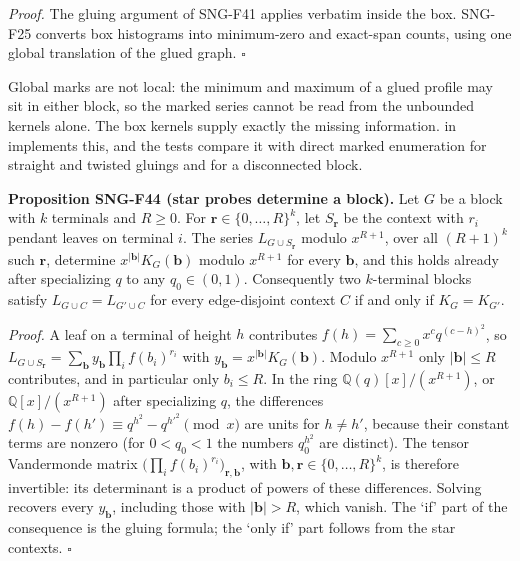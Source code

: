 \documentclass[
  11pt,
  a4paper,
]{report}
\let\singularitytexttt\texttt
\renewcommand{\texttt}[1]{\singularitytexttt{\seqsplit{#1}}}
\begin{document}
\emph{Proof.} The gluing argument of SNG-F41 applies verbatim inside the
box. SNG-F25 converts box histograms into minimum-zero and exact-span
counts, using one global translation of the glued graph. \(\square\)

Global marks are not local: the minimum and maximum of a glued profile
may sit in either block, so the marked series cannot be read from the
unbounded kernels alone. The box kernels supply exactly the missing
information. \texttt{marked\_glue} in
\texttt{src/singularity/terminals.py} implements this, and the tests
compare it with direct marked enumeration for straight and twisted
gluings and for a disconnected block.

\textbf{Proposition SNG-F44 (star probes determine a block).} Let \(G\)
be a block with \(k\) terminals and \(R\ge0\). For
\(\mathbf r\in\{0,\ldots,R\}^k\), let \(S_{\mathbf r}\) be the context
with \(r_i\) pendant leaves on terminal \(i\). The series
\(L_{G\cup S_{\mathbf r}}\) modulo \(x^{R+1}\), over all \((R+1)^k\)
such \(\mathbf r\), determine \(x^{|\mathbf b|}K_G(\mathbf b)\) modulo
\(x^{R+1}\) for every \(\mathbf b\), and this holds already after
specializing \(q\) to any \(q_0\in(0,1)\). Consequently two
\(k\)-terminal blocks satisfy \(L_{G\cup C}=L_{G'\cup C}\) for every
edge-disjoint context \(C\) if and only if \(K_G=K_{G'}\).

\emph{Proof.} A leaf on a terminal of height \(h\) contributes
\(f(h)=\sum_{c\ge0}x^cq^{(c-h)^2}\), so
\(L_{G\cup S_{\mathbf r}}=\sum_{\mathbf b}y_{\mathbf b}\prod_if(b_i)^{r_i}\)
with \(y_{\mathbf b}=x^{|\mathbf b|}K_G(\mathbf b)\). Modulo \(x^{R+1}\)
only \(|\mathbf b|\le R\) contributes, and in particular only
\(b_i\le R\). In the ring \(\mathbb Q(q)[x]/(x^{R+1})\), or
\(\mathbb Q[x]/(x^{R+1})\) after specializing \(q\), the differences
\(f(h)-f(h')\equiv q^{h^2}-q^{h'^2}\pmod x\) are units for \(h\ne h'\),
because their constant terms are nonzero (for \(0<q_0<1\) the numbers
\(q_0^{h^2}\) are distinct). The tensor Vandermonde matrix
\(\bigl(\prod_if(b_i)^{r_i}\bigr)_{\mathbf r,\mathbf b}\), with
\(\mathbf b,\mathbf r\in\{0,\ldots,R\}^k\), is therefore invertible: its
determinant is a product of powers of these differences. Solving
recovers every \(y_{\mathbf b}\), including those with
\(|\mathbf b|>R\), which vanish. The `if' part of the consequence is the
gluing formula; the `only if' part follows from the star contexts.
\(\square\)
\end{document}
